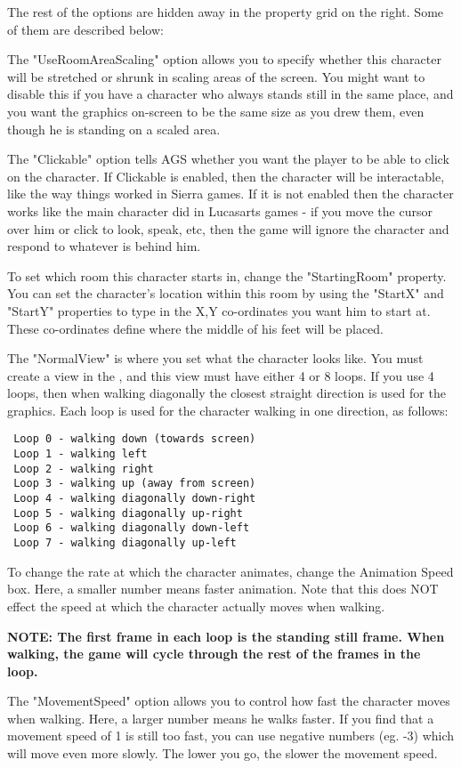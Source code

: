The rest of the options are hidden away in the property grid on the right. Some
of them are described below:

The "UseRoomAreaScaling" option allows you to specify whether this
character will be stretched or shrunk in scaling areas of the screen. You might
want to disable this if you have a character who always stands still in the same
place, and you want the graphics on-screen to be the same size as you drew
them, even though he is standing on a scaled area.

The "Clickable" option tells AGS whether you want the player to be able
to click on the character. If Clickable is enabled, then the character will
be interactable, like the way things worked in Sierra games. If it is not
enabled then the character works like the main character did in Lucasarts games -
if you move the cursor over him or click to look, speak, etc, then the game will
ignore the character and respond to whatever is behind him.

To set which room this character starts in, change the "StartingRoom"
property. You can set the character's location within this room by using
the "StartX" and "StartY" properties to type in the X,Y co-ordinates you want him
to start at. These co-ordinates define where the middle of his feet will be placed.

The "NormalView" is where you set what the character looks like. You must
create a view in the , and this
view must have either 4 or 8 loops. If you use 4 loops, then when walking
diagonally the closest straight direction is used for the graphics. Each loop
is used for the character walking in one direction, as follows:
\begin{verbatim}
 Loop 0 - walking down (towards screen)
 Loop 1 - walking left
 Loop 2 - walking right
 Loop 3 - walking up (away from screen)
 Loop 4 - walking diagonally down-right
 Loop 5 - walking diagonally up-right
 Loop 6 - walking diagonally down-left
 Loop 7 - walking diagonally up-left
\end{verbatim}
To change the rate at which the character animates, change the Animation Speed box.
Here, a smaller number means faster animation. Note that this does NOT
effect the speed at which the character actually moves when walking.

\bf{NOTE:} The first frame in each loop is the standing still frame. When walking, the
game will cycle through the rest of the frames in the loop.

The "MovementSpeed" option allows you to control how fast the character moves when
walking. Here, a larger number means he walks faster. If you find that a movement
speed of 1 is still too fast, you can use negative numbers (eg. -3) which will move
even more slowly. The lower you go, the slower the movement speed.

